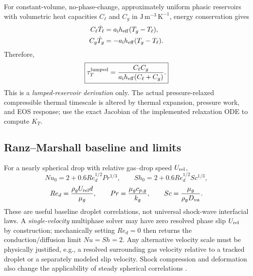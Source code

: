 \documentclass[11pt,letterpaper]{article}
\newcommand{\mi}{\mathrm{i}}
\newcommand{\area}{a_\mi}
\begin{document}
For constant-volume, no-phase-change, approximately uniform phasic reservoirs with volumetric heat capacities $C_\ell$ and $C_g$ in $\mathrm{J\,m^{-3}\,K^{-1}}$, energy conservation gives
\begin{align}
C_\ell \dot T_\ell&=\area h_{\rm eff}(T_g-T_\ell),\\
C_g \dot T_g&=-\area h_{\rm eff}(T_g-T_\ell).
\end{align}
Therefore,
\begin{equation}\label{eq:tauT}
\boxed{\tau_T^{\rm lumped}=\frac{C_\ell C_g}{\area h_{\rm eff}(C_\ell+C_g)}.}
\end{equation}
This is a \emph{lumped-reservoir derivation} only. The actual pressure-relaxed compressible thermal timescale is altered by thermal expansion, pressure work, and EOS response; use the exact Jacobian of the implemented relaxation ODE to compute $K_T$.

\subsection{Ranz--Marshall baseline and limits}
For a nearly spherical drop with relative gas--drop speed $U_{\rm rel}$,
\begin{equation}\label{eq:RM}
Nu_0=2+0.6Re_d^{1/2}Pr^{1/3},\qquad
Sh_0=2+0.6Re_d^{1/2}Sc^{1/3},
\end{equation}
\begin{equation}
Re_d=\frac{\rho_g U_{\rm rel}d}{\mu_g},\qquad
Pr=\frac{\mu_gc_{p,g}}{k_g},\qquad
Sc=\frac{\mu_g}{\rho_g D_{va}}.
\end{equation}
These are useful baseline droplet correlations, not universal shock-wave interfacial laws. A \emph{single-velocity} multiphase solver may have zero resolved phase slip $U_{\rm rel}$ by construction; mechanically setting $Re_d=0$ then returns the conduction/diffusion limit $Nu=Sh=2$. Any alternative velocity scale must be physically justified, e.g., a resolved surrounding gas velocity relative to a tracked droplet or a separately modeled slip velocity. Shock compression and deformation also change the applicability of steady spherical correlations \cite{AbramzonSirignano1989,LiaoLucas2018}.
\end{document}
